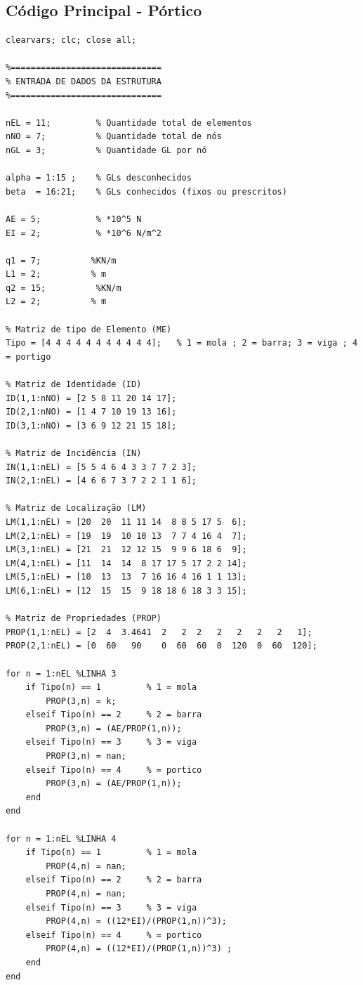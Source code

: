 \documentclass[deposito, acronym, symbols]{fei}
\begin{document}
\subsection{Código Principal - Pórtico}

\begin{lstlisting}
clearvars; clc; close all;

%==============================
% ENTRADA DE DADOS DA ESTRUTURA
%==============================

nEL = 11;         % Quantidade total de elementos
nNO = 7;          % Quantidade total de nós
nGL = 3;          % Quantidade GL por nó

alpha = 1:15 ;    % GLs desconhecidos
beta  = 16:21;    % GLs conhecidos (fixos ou prescritos)

AE = 5;           % *10^5 N
EI = 2;           % *10^6 N/m^2

q1 = 7;          %KN/m
L1 = 2;          % m
q2 = 15;          %KN/m
L2 = 2;          % m

% Matriz de tipo de Elemento (ME)
Tipo = [4 4 4 4 4 4 4 4 4 4 4];   % 1 = mola ; 2 = barra; 3 = viga ; 4 = portigo
 
% Matriz de Identidade (ID)
ID(1,1:nNO) = [2 5 8 11 20 14 17];
ID(2,1:nNO) = [1 4 7 10 19 13 16];
ID(3,1:nNO) = [3 6 9 12 21 15 18];

% Matriz de Incidência (IN)
IN(1,1:nEL) = [5 5 4 6 4 3 3 7 7 2 3];
IN(2,1:nEL) = [4 6 6 7 3 7 2 2 1 1 6];

% Matriz de Localização (LM)
LM(1,1:nEL) = [20  20  11 11 14  8 8 5 17 5  6];
LM(2,1:nEL) = [19  19  10 10 13  7 7 4 16 4  7];
LM(3,1:nEL) = [21  21  12 12 15  9 9 6 18 6  9];
LM(4,1:nEL) = [11  14  14  8 17 17 5 17 2 2 14];
LM(5,1:nEL) = [10  13  13  7 16 16 4 16 1 1 13];
LM(6,1:nEL) = [12  15  15  9 18 18 6 18 3 3 15];

% Matriz de Propriedades (PROP)
PROP(1,1:nEL) = [2  4  3.4641  2   2  2   2   2   2   2   1];
PROP(2,1:nEL) = [0  60   90    0  60  60  0  120  0  60  120];

for n = 1:nEL %LINHA 3
    if Tipo(n) == 1         % 1 = mola
        PROP(3,n) = k;
    elseif Tipo(n) == 2     % 2 = barra
        PROP(3,n) = (AE/PROP(1,n));
    elseif Tipo(n) == 3     % 3 = viga
        PROP(3,n) = nan;
    elseif Tipo(n) == 4     % = portico 
        PROP(3,n) = (AE/PROP(1,n));
    end
end

for n = 1:nEL %LINHA 4
    if Tipo(n) == 1         % 1 = mola
        PROP(4,n) = nan;
    elseif Tipo(n) == 2     % 2 = barra
        PROP(4,n) = nan;
    elseif Tipo(n) == 3     % 3 = viga
        PROP(4,n) = ((12*EI)/(PROP(1,n))^3);
    elseif Tipo(n) == 4     % = portico 
        PROP(4,n) = ((12*EI)/(PROP(1,n))^3) ;
    end
end


\end{lstlisting}
\end{document}
